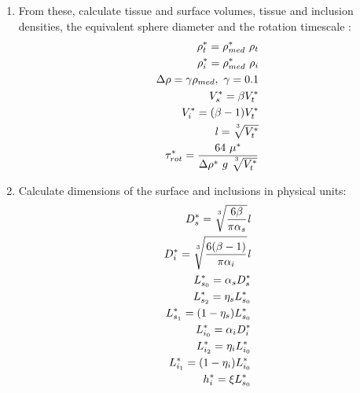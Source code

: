 \documentclass[10pt,a4paper]{article}
\def\non{\nonumber}
\def\l{\mathit{l}}
\begin{document}
\begin{enumerate}
	\item From these, calculate tissue and surface volumes, tissue and inclusion densities, the equivalent sphere diameter and the rotation timescale :
\begin{eqnarray}\label{nd2dpars3}
	\rho^*_t = \rho^*_{med} ~ \rho_t \non \\
	\rho^*_i = \rho^*_{med} ~ \rho_i \non \\
	\Delta \rho = \gamma \rho_{med}, ~ \gamma = 0.1 \non \\
	V_s^* = \beta V_t^* \non \\
	V_i^* = (\beta-1) V_t^* \non \\
	\l = \sqrt[\uproot{5}3]{V_t^*} \non \\
	\tau^*_{rot} = \frac{64 ~ \mu^*}{\Delta \rho^* ~ g ~ \sqrt[\uproot{5}3]{V_t^*}}
\end{eqnarray}
\item Calculate dimensions of the surface and inclusions in physical units:
\begin{eqnarray}\label{nd2dpars4}
	D_s^* = \sqrt[\uproot{5}3]{\frac{6 \beta}{\pi \alpha_s}} \l \non \\
	D^*_i = \sqrt[\uproot{5}3]{\frac{6 (\beta-1)}{\pi \alpha_i}} \l \non \\
	L^*_{s_0} = \alpha_s D^*_s \non \\
	L^*_{s_2} = \eta_s L^*_{s_0} \non \\
	L^*_{s_1} = (1-\eta_s) L^*_{s_0} \non \\
	L^*_{i_0} = \alpha_i D^*_i \non \\
	L^*_{i_2} = \eta_i L^*_{i_0} \non \\
	L^*_{i_1} = (1-\eta_i) L^*_{i_0} \non \\
	h^*_i = \xi L^*_{s_0}  \non \\
\end{eqnarray}

\end{enumerate}
\end{document}

